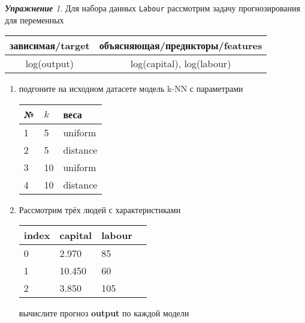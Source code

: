 \documentclass[a4,12pt]{article}
\theoremstyle{remark}
\newtheorem{exercise}{\textbf{Упражнение}}[section]
\begin{document}
\begin{exercise}
Для набора данных \texttt{Labour} рассмотрим задачу прогнозирования
для переменных
\begin{center}
	\begin{tabular}{|c|c|}\hline
		зависимая/target & объясняющая/предикторы/features \\ \hline
		log(output) & log(capital), log(labour) \\ \hline
	\end{tabular}
\end{center}
\begin{enumerate}
	\item подгоните на исходном датасете модель k-NN с параметрами
	\begin{center}
		\begin{tabular}{|l|l|l|}\hline
		№ & \(k\) & веса \\ \hline
		1 & 5 & uniform \\
		2 & 5 & distance \\
		3 & 10 & uniform \\
		4 & 10 & distance \\ \hline
		\end{tabular}
	\end{center}
	\item Рассмотрим трёх людей с характеристиками
	\begin{center}
		\begin{tabular}{|l||l||l|l|}\hline
			index & capital & labour \\ \hline\hline
			0 & 2.970 & 85 \\
			1 & 10.450 & 60  \\
			2 & 3.850 & 105 \\ \hline
		\end{tabular}
	\end{center}
	вычислите прогноз \textbf{output} по каждой модели
\end{enumerate}
\end{exercise}
\end{document}
